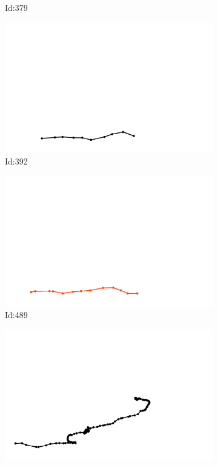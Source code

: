 \documentclass[12pt,twoside]{report}
\begin{document}
\begin{figure}
\begin{subfigure}[b]{0.20\textwidth}
\caption{Id:379}
\end{subfigure}
\begin{subfigure}[b]{0.20\textwidth}
\centering
\includegraphics[width=\textwidth]{../trajectories/392.png}
\caption{Id:392}
\end{subfigure}
\begin{subfigure}[b]{0.20\textwidth}
\centering
\includegraphics[width=\textwidth]{../trajectories/489.png}
\caption{Id:489}
\end{subfigure}
\begin{subfigure}[b]{0.20\textwidth}
\centering
\includegraphics[width=\textwidth]{../trajectories/500.png}

\end{subfigure}
\end{figure}
\end{document}
